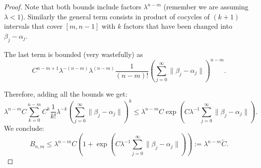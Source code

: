 \documentclass[11pt]{amsart}
\theoremstyle{definition}
\theoremstyle{remark}
\numberwithin{equation}{section}
\begin{document}
\begin{proof}
  Note that both bounds include factors $\lambda^{n -m}$
  (remember we are assuming $\lambda <  1$).
  Similarly the general term  consists in product of cocycles of
  $(k+1)$ intervals that cover  $[m,n-1]$ with $k$ factors that have
  been changed into $\beta_j - \alpha_j$.


  The last term is  bounded (very wastefully)  as
  \[
  C^{n-m+1} \lambda^{-(n-m)} \lambda^{(n-m)} \frac{1}{(n-m)!}
  \left( \sum_{j=0}^{\infty} \| \beta_j - \alpha_j\| \right)^{n-m}.
  \]

  Therefore, adding all the bounds we get:
  \[
  \lambda^{n-m} C \sum_{k = 0}^{n-m} C^k \frac{1}{k!} \lambda^{-k}
  \left( \sum_{j=0}^{\infty} \| \beta_j - \alpha_j\| \right)^{k}
  \le \lambda^{n-m} C \exp\left( C \lambda^{-1} \sum_{j=0}^{\infty} \| \beta_j - \alpha_j\| \right).
  \]
 We conclude:
 \[B_{n,m}\le  \lambda^{n-m} C\left(1+\exp\left( C \lambda^{-1} \sum_{j=0}^{\infty} \| \beta_j - \alpha_j\|\right )\right):=\lambda^{n-m}\tilde{C}.\]

\end{proof}
\end{document}
